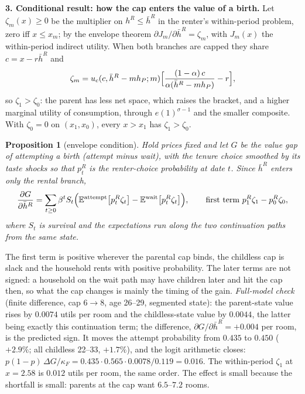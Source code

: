\documentclass[10pt]{article}
\newtheorem{proposition}{Proposition}
\newcommand{\E}{\mathbb E}
\newcommand{\1}{\mathbf 1}
\newcommand{\hbR}{\bar h^{R}}
\begin{document}
\medskip
\textbf{3. Conditional result: how the cap enters the value of a birth.}
Let $\zeta_m(x)\ge0$ be the multiplier on $h^{R}\le\hbR$ in the renter's within-period problem, zero iff $x\le x_m$; by the envelope theorem $\partial J_m/\partial\hbR=\zeta_m$, with $J_m(x)$ the within-period indirect utility. When both branches are capped they share $c=x-r\hbR$ and
\[
\zeta_m=u_c(c,\hbR-mh_P;m)\Bigl[\frac{(1-\alpha)\,c}{\alpha(\hbR-mh_P)}-r\Bigr],
\]
so $\zeta_1>\zeta_0$: the parent has less net space, which raises the bracket, and a higher marginal utility of consumption, through $e(1)^{\sigma-1}$ and the smaller composite. With $\zeta_0=0$ on $(x_1,x_0)$, every $x>x_1$ has $\zeta_1>\zeta_0$.
\begin{proposition}[envelope condition]
Hold prices fixed and let $G$ be the value gap of attempting a birth (attempt minus wait), with the tenure choice smoothed by its taste shocks so that $p^{R}_t$ is the renter-choice probability at date $t$. Since $\hbR$ enters only the rental branch,
\[
\frac{\partial G}{\partial\hbR}=\sum_{t\ge0}\beta^{t}S_t\Bigl(\E^{\mathrm{attempt}}\bigl[p^{R}_t\zeta_t\bigr]-\E^{\mathrm{wait}}\bigl[p^{R}_t\zeta_t\bigr]\Bigr),
\qquad\text{first term } p^{R}_1\zeta_1-p^{R}_0\zeta_0,
\]
where $S_t$ is survival and the expectations run along the two continuation paths from the same state.
\end{proposition}
The first term is positive wherever the parental cap binds, the childless cap is slack and the household rents with positive probability. The later terms are not signed: a household on the wait path may have children later and hit the cap then, so what the cap changes is mainly the timing of the gain. \emph{Full-model check} (finite difference, cap $6\to8$, age 26--29, segmented state): the parent-state value rises by $0.0074$ utils per room and the childless-state value by $0.0044$, the latter being exactly this continuation term; the difference, $\partial G/\partial\hbR=+0.004$ per room, is the predicted sign. It moves the attempt probability from $0.435$ to $0.450$ ($+2.9\%$; all childless 22--33, $+1.7\%$), and the logit arithmetic closes: $p(1-p)\,\Delta G/\kappa_F=0.435\cdot0.565\cdot0.0078/0.119=0.016$. The within-period $\zeta_1$ at $x=2.58$ is $0.012$ utils per room, the same order. The effect is small because the shortfall is small: parents at the cap want $6.5$--$7.2$ rooms.
\end{document}
